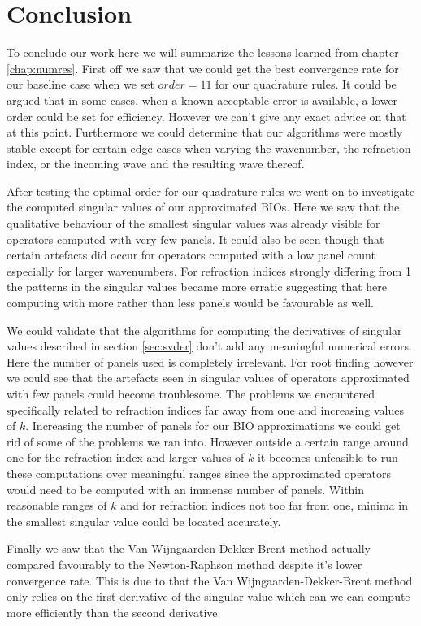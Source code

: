 \documentclass[a4paper, oneside]{discothesis}
\begin{document}
\chapter{Conclusion}
To conclude our work here we will summarize the lessons learned from chapter \ref{chap:numres}.
First off we saw that we could get the best convergence rate for our baseline case when we set $order=11$ for our quadrature rules.
It could be argued that in some cases, when a known acceptable error is available, a lower order could be set for efficiency.
However we can't give any exact advice on that at this point.
Furthermore we could determine that our algorithms were mostly stable except for certain edge cases when varying the wavenumber, the refraction index, or the incoming wave and the resulting wave thereof.

After testing the optimal order for our quadrature rules we went on to investigate the computed singular values of our approximated BIOs.
Here we saw that the qualitative behaviour of the smallest singular values was already visible for operators computed with very few panels.
It could also be seen though that certain artefacts did occur for operators computed with a low panel count especially for larger wavenumbers.
For refraction indices strongly differing from 1 the patterns in the singular values became more erratic suggesting that here computing with more rather than less panels would be favourable as well.

We could validate that the algorithms for computing the derivatives of singular values described in section \ref{sec:svder} don't add any meaningful numerical errors.
Here the number of panels used is completely irrelevant.
For root finding however we could see that the artefacts seen in singular values of operators approximated with few panels could become troublesome.
The problems we encountered specifically related to refraction indices far away from one and increasing values of $k$.
Increasing the number of panels for our BIO approximations we could get rid of some of the problems we ran into.
However outside a certain range around one for the refraction index and larger values of $k$ it becomes unfeasible to run these computations over meaningful ranges since the approximated operators would need to be computed with an immense number of panels.
Within reasonable ranges of $k$ and for refraction indices not too far from one, minima in the smallest singular value could be located accurately.

Finally we saw that the Van Wijngaarden-Dekker-Brent method actually compared favourably to the Newton-Raphson method despite it's lower convergence rate.
This is due to that the Van Wijngaarden-Dekker-Brent method only relies on the first derivative of the singular value which can we can compute more efficiently than the second derivative.
\end{document}

